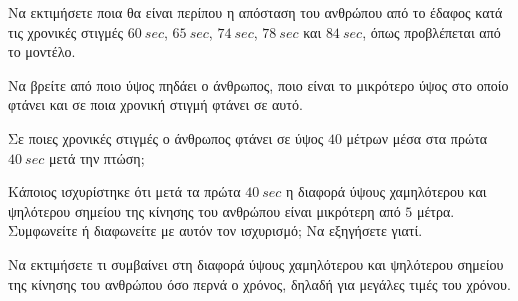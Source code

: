 \begin{alist}
\item Να εκτιμήσετε ποια θα είναι περίπου η απόσταση του ανθρώπου από το έδαφος κατά τις χρονικές στιγμές $60\ \si{sec}$, $65\ \si{sec}$, $74\ \si{sec}$, $78\ \si{sec}$ και $84\ \si{sec}$, όπως προβλέπεται από το μοντέλο.
\item Να βρείτε από ποιο ύψος πηδάει ο άνθρωπος, ποιο είναι το μικρότερο ύψος στο οποίο φτάνει και σε ποια χρονική στιγμή φτάνει σε αυτό.
\item Σε ποιες χρονικές στιγμές ο άνθρωπος φτάνει σε ύψος $40$ μέτρων μέσα στα πρώτα $40\ \si{sec}$ μετά την πτώση;

\begin{center}

\end{center}
\item Κάποιος ισχυρίστηκε ότι μετά τα πρώτα $40\ \si{sec}$ η διαφορά ύψους χαμηλότερου και ψηλότερου σημείου της κίνησης του ανθρώπου είναι μικρότερη από $5$ μέτρα. Συμφωνείτε ή διαφωνείτε με αυτόν τον ισχυρισμό; Να εξηγήσετε γιατί.
\item Να εκτιμήσετε τι συμβαίνει στη διαφορά ύψους χαμηλότερου και ψηλότερου σημείου της κίνησης του ανθρώπου όσο περνά ο χρόνος, δηλαδή για μεγάλες τιμές του χρόνου.
\end{alist}

